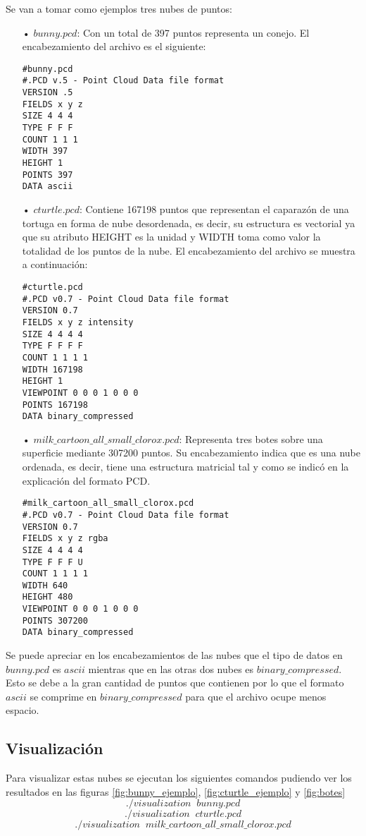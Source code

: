 Se van a tomar como ejemplos tres nubes de puntos:
\begin{itemize}
\item[•]$bunny.pcd$: 
Con un total de 397 puntos representa un conejo. El encabezamiento del archivo es el siguiente:\\
\begin{lstlisting}
#bunny.pcd
#.PCD v.5 - Point Cloud Data file format
VERSION .5
FIELDS x y z
SIZE 4 4 4
TYPE F F F
COUNT 1 1 1
WIDTH 397
HEIGHT 1
POINTS 397
DATA ascii
\end{lstlisting}

\item[•]$cturtle.pcd$:
Contiene 167198 puntos que representan el caparazón de una tortuga en forma de nube desordenada, es decir, su estructura es vectorial ya que su atributo HEIGHT es la unidad y WIDTH toma como valor la totalidad de los puntos de la nube. El encabezamiento del archivo se muestra a continuación:\\
\begin{lstlisting}
#cturtle.pcd
#.PCD v0.7 - Point Cloud Data file format
VERSION 0.7
FIELDS x y z intensity
SIZE 4 4 4 4
TYPE F F F F
COUNT 1 1 1 1
WIDTH 167198
HEIGHT 1
VIEWPOINT 0 0 0 1 0 0 0
POINTS 167198
DATA binary_compressed
\end{lstlisting}


\item[•]$milk\_cartoon\_all\_small\_clorox.pcd$:
Representa tres botes sobre una superficie mediante 307200 puntos. Su encabezamiento indica que es una nube ordenada, es decir, tiene una estructura matricial tal y como se indicó en la explicación del formato PCD.\\
\begin{lstlisting}
#milk_cartoon_all_small_clorox.pcd
#.PCD v0.7 - Point Cloud Data file format
VERSION 0.7
FIELDS x y z rgba
SIZE 4 4 4 4
TYPE F F F U
COUNT 1 1 1 1
WIDTH 640
HEIGHT 480
VIEWPOINT 0 0 0 1 0 0 0
POINTS 307200
DATA binary_compressed
\end{lstlisting}

\end{itemize}

Se puede apreciar en los encabezamientos de las nubes que el tipo de datos en $bunny.pcd$ es $ascii$ mientras que en las otras dos nubes es $binary\_compressed$. Esto se debe a la gran cantidad de puntos que contienen por lo que el formato $ascii$ se comprime en $binary\_compressed$ para que el archivo ocupe menos espacio.

\subsection{Visualización}
Para visualizar estas nubes se ejecutan los siguientes comandos pudiendo ver los resultados en las figuras \ref{fig:bunny_ejemplo}, \ref{fig:cturtle_ejemplo} y \ref{fig:botes} 
$$./visualization\;\;bunny.pcd$$
$$./visualization\;\;cturtle.pcd$$
$$./visualization\;\;milk\_cartoon\_all\_small\_clorox.pcd$$

